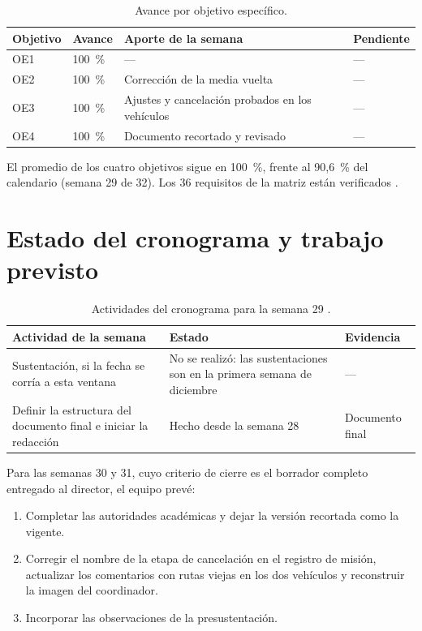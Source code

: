 \documentclass[12pt,letterpaper]{article}
\begin{document}
\begin{table}[H]
\centering
\small
\caption{Avance por objetivo específico.}
\begin{tabular}{@{}p{1.6cm}p{1.6cm}p{8.6cm}p{2.2cm}@{}}
\toprule
\textbf{Objetivo} & \textbf{Avance} & \textbf{Aporte de la semana} & \textbf{Pendiente} \\ \midrule
OE1 & 100~\% & --- & --- \\
OE2 & 100~\% & Corrección de la media vuelta & --- \\
OE3 & 100~\% & Ajustes y cancelación probados en los vehículos & --- \\
OE4 & 100~\% & Documento recortado y revisado & --- \\ \bottomrule
\end{tabular}
\end{table}

El promedio de los cuatro objetivos sigue en 100~\%, frente al 90,6~\% del calendario (semana 29 de 32). Los 36 requisitos de la matriz están verificados \cite{requisitos}.

\section{Estado del cronograma y trabajo previsto}

\begin{table}[H]
\centering
\small
\caption{Actividades del cronograma para la semana 29 \cite{cronograma}.}
\begin{tabular}{@{}p{6.4cm}p{6.4cm}p{2.6cm}@{}}
\toprule
\textbf{Actividad de la semana} & \textbf{Estado} & \textbf{Evidencia} \\ \midrule
Sustentación, si la fecha se corría a esta ventana & No se realizó: las sustentaciones son en la primera semana de diciembre & --- \\
Definir la estructura del documento final e iniciar la redacción & Hecho desde la semana 28 & Documento final \\ \bottomrule
\end{tabular}
\end{table}

Para las semanas 30 y 31, cuyo criterio de cierre es el borrador completo entregado al director, el equipo prevé:

\begin{enumerate}
    \item Completar las autoridades académicas y dejar la versión recortada como la vigente.
    \item Corregir el nombre de la etapa de cancelación en el registro de misión, actualizar los comentarios con rutas viejas en los dos vehículos y reconstruir la imagen del coordinador.
    \item Incorporar las observaciones de la presustentación.
\end{enumerate}
\end{document}
